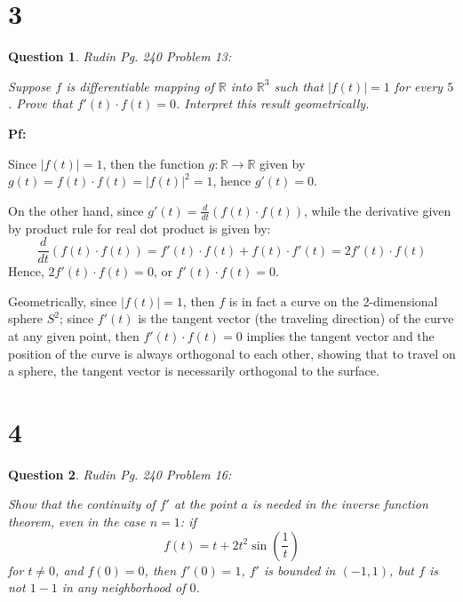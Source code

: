 \documentclass{article}
\newtheorem{question}{Question}
\begin{document}
\break

\section*{3}
\begin{myBox}[]{}
    \begin{question}
        Rudin Pg. 240 Problem 13:

        Suppose $f$ is differentiable mapping of $\mathbb{R}$ into $\mathbb{R}^3$ such that $|f(t)|=1$ for every $5$.
        Prove that $f'(t)\cdot f(t)=0$. Interpret this result geometrically.
    \end{question}
\end{myBox}

\textbf{Pf:}

Since $|f(t)|=1$, then the function $g:\mathbb{R}\rightarrow\mathbb{R}$ given by $g(t)=f(t)\cdot f(t)=|f(t)|^2 = 1$, hence $g'(t)=0$.

On the other hand, since $g'(t) = \frac{d}{dt}(f(t)\cdot f(t))$, while the derivative given by product rule for real dot product is given by:
$$\frac{d}{dt}(f(t)\cdot f(t)) = f'(t)\cdot f(t) + f(t)\cdot f'(t) = 2f'(t)\cdot f(t)$$
Hence, $2f'(t)\cdot f(t)=0$, or $f'(t)\cdot f(t)=0$.

Geometrically, since $|f(t)|=1$, then $f$ is in fact a curve on the 2-dimensional sphere $S^2$; since $f'(t)$ is the tangent vector (the traveling direction) of the curve at any given point,
then $f'(t)\cdot f(t)=0$ implies the tangent vector and the position of the curve is always orthogonal to each other, showing that to travel on a sphere, the tangent vector is necessarily orthogonal to the surface.

\hfil

\hfil

\section*{4}
\begin{myBox}[]{}
    \begin{question}
        Rudin Pg. 240 Problem 16:

        Show that the continuity of $f'$ at the point $a$ is needed in the inverse function theorem, even in the case $n=1$: if
        $$f(t)=t+2t^2\sin\left(\frac{1}{t}\right)$$
        for $t\neq 0$, and $f(0)=0$, then $f'(0)=1$, $f'$ is bounded in $(-1,1)$, but $f$ is not $1-1$ in any neighborhood of $0$.
    \end{question}
\end{myBox}
\end{document}
